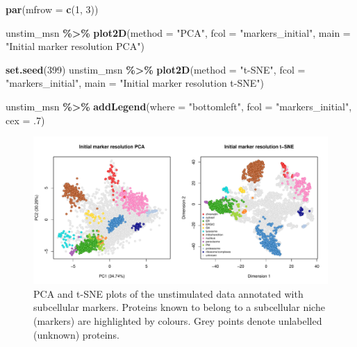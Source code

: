 \documentclass[9pt,a4paper,]{extarticle}
\newenvironment{Shaded}{\begin{snugshade}}{\end{snugshade}}
\newcommand{\AttributeTok}[1]{\textcolor[rgb]{0.13,0.29,0.53}{#1}}
\newcommand{\DecValTok}[1]{\textcolor[rgb]{0.00,0.00,0.81}{#1}}
\newcommand{\FunctionTok}[1]{\textcolor[rgb]{0.13,0.29,0.53}{\textbf{#1}}}
\newcommand{\NormalTok}[1]{#1}
\newcommand{\SpecialCharTok}[1]{\textcolor[rgb]{0.81,0.36,0.00}{\textbf{#1}}}
\newcommand{\StringTok}[1]{\textcolor[rgb]{0.31,0.60,0.02}{#1}}
\begin{document}
\begin{Shaded}
\begin{Highlighting}[]
\FunctionTok{par}\NormalTok{(}\AttributeTok{mfrow =} \FunctionTok{c}\NormalTok{(}\DecValTok{1}\NormalTok{, }\DecValTok{3}\NormalTok{))}

\NormalTok{unstim\_msn }\SpecialCharTok{\%\textgreater{}\%}
\FunctionTok{plot2D}\NormalTok{(}\AttributeTok{method =} \StringTok{"PCA"}\NormalTok{, }\AttributeTok{fcol =} \StringTok{"markers\_initial"}\NormalTok{,}
       \AttributeTok{main =} \StringTok{"Initial marker resolution PCA"}\NormalTok{)}

\FunctionTok{set.seed}\NormalTok{(}\DecValTok{399}\NormalTok{)}
\NormalTok{unstim\_msn }\SpecialCharTok{\%\textgreater{}\%}
\FunctionTok{plot2D}\NormalTok{(}\AttributeTok{method =} \StringTok{"t{-}SNE"}\NormalTok{, }\AttributeTok{fcol =} \StringTok{"markers\_initial"}\NormalTok{, }
       \AttributeTok{main =} \StringTok{"Initial marker resolution t{-}SNE"}\NormalTok{)}

\NormalTok{unstim\_msn }\SpecialCharTok{\%\textgreater{}\%} 
  \FunctionTok{addLegend}\NormalTok{(}\AttributeTok{where =} \StringTok{"bottomleft"}\NormalTok{, }\AttributeTok{fcol =} \StringTok{"markers\_initial"}\NormalTok{, }\AttributeTok{cex =}\NormalTok{ .}\DecValTok{7}\NormalTok{)}
\end{Highlighting}
\end{Shaded}

\begin{figure}[H]

{\centering \includegraphics[width=0.9\linewidth,]{figs/og_mrk_maps} 

}

\caption{PCA and t-SNE plots of the unstimulated data annotated with subcellular markers. Proteins known to belong to a subcellular niche (markers) are highlighted by colours. Grey points denote unlabelled (unknown) proteins.}\label{fig:mrk-fig}
\end{figure}
\end{document}
